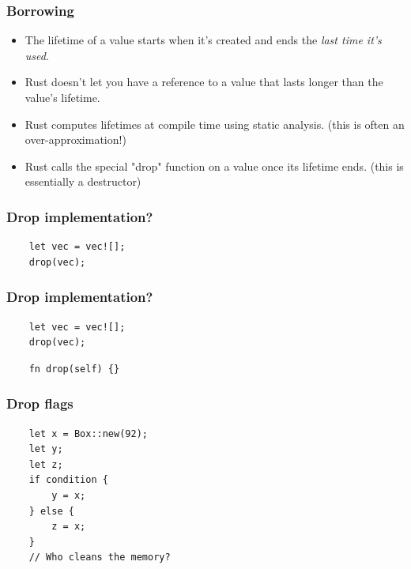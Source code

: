 \documentclass[aspectratio=1610,t]{beamer}
\begin{document}

\begin{frame}[fragile]
\frametitle{Borrowing}
\begin{itemize}
    \item The lifetime of a value starts when it's created and ends the \textit{last time it's used}.
    \item Rust doesn't let you have a reference to a value that lasts longer than the value's lifetime.
    \item Rust computes lifetimes at compile time using static analysis. (this is often an over-approximation!)
    \item Rust calls the special "drop" function on a value once its lifetime ends. (this is essentially a destructor)
\end{itemize}
\end{frame}


\begin{frame}[fragile]
\frametitle{Drop implementation?}
\begin{verbatim}
    let vec = vec![];
    drop(vec);
\end{verbatim}
\end{frame}


\begin{frame}[fragile]
\frametitle{Drop implementation?}
\begin{verbatim}
    let vec = vec![];
    drop(vec);
\end{verbatim}

\begin{verbatim}
    fn drop(self) {}
\end{verbatim}
\end{frame}


\begin{frame}[fragile]
\frametitle{Drop flags}
\begin{verbatim}
    let x = Box::new(92);
    let y;
    let z;
    if condition {
        y = x;
    } else {
        z = x;
    }
    // Who cleans the memory?
\end{verbatim}
\end{frame}
\end{document}
